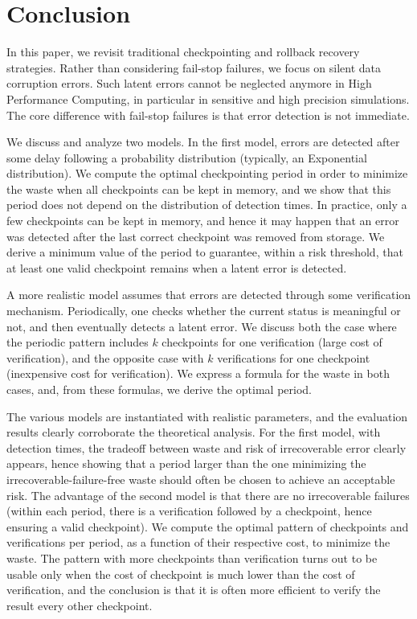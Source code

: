 \documentclass[10pt,table]{article}
\begin{document}
\section{Conclusion}
\label{sec.conclusion}


In this paper, we revisit traditional checkpointing  and rollback recovery strategies.
Rather than considering fail-stop failures, we focus on silent data corruption errors.
Such latent errors cannot be neglected anymore in High Performance Computing, in particular
in sensitive and high precision simulations. The core difference with fail-stop failures is
that error detection is not immediate.

We discuss and analyze two models. In the first model, errors are detected after some delay following a
probability distribution (typically, an Exponential distribution). We compute the optimal 
checkpointing period in order to minimize the waste when all checkpoints can be kept in memory,
and we show that this period does not depend on the distribution of detection times. In practice,
only a few checkpoints can be kept in memory, and hence it may happen
that an error was detected after
the last correct checkpoint was removed from storage. We derive a minimum value of the period
 to guarantee, within a risk threshold,  that at least one valid
 checkpoint remains when a latent error is detected. 

A more realistic model assumes that errors are detected through some verification mechanism.
Periodically, one checks whether the current status is meaningful or not, and then eventually detects
a latent error. We discuss both the case where the periodic pattern includes $k$ checkpoints 
for one verification (large cost of verification), and the opposite case with $k$ verifications
for one checkpoint (inexpensive cost for verification). We express a formula for the waste in both cases,
and, from these formulas, we derive the optimal period. 

The various models are instantiated with realistic parameters, and the evaluation results 
clearly corroborate the theoretical analysis. For the first model, with detection times, 
the tradeoff between waste and risk of irrecoverable error clearly appears, hence showing that
a period larger than the one minimizing the irrecoverable-failure-free waste should often be chosen 
to achieve an acceptable risk. 
The advantage of the second model is that there are no irrecoverable failures (within each period,
there is a verification followed by a checkpoint, hence ensuring a valid checkpoint). 
We compute the optimal pattern of checkpoints and verifications per period, as a function of their
respective cost, to minimize the waste. The pattern with more checkpoints than verification turns out
to be usable only when the cost of checkpoint is much lower than the cost of verification, 
and the conclusion is that it is often more efficient to verify the result every other checkpoint. 
\end{document}
